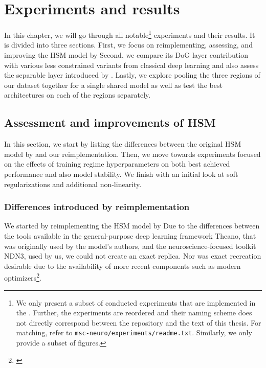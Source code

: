 \renewcommand*\thesubsubsection{\arabic{section}.\arabic{subsection}.\arabic{subsubsection}}
\setlength{\abovecaptionskip}{0pt plus 0pt minus 0pt} %

\chapter{Experiments and results}\label{ch:5}

In this chapter, we will go through all notable\footnote{We only present a subset of conducted experiments that are implemented in the . Further, the experiments are reordered and their naming scheme does not directly correspond between the repository and the text of this thesis. For matching, refer to \texttt{msc-neuro/experiments/readme.txt}. Similarly, we only provide a subset of figures.} experiments and their results. It is divided into three sections. First, we focus on reimplementing, assessing, and improving the HSM model by \cite{antolik} Second, we compare its DoG layer contribution with various less constrained variants from classical deep learning and also assess the separable layer introduced by \cite{klindt}. Lastly, we explore pooling the three regions of our dataset together for a single shared model as well as test the best architectures on each of the regions separately.


\section{Assessment and improvements of HSM}

In this section, we start by listing the differences between the original HSM model by \citeauthor{antolik} and our reimplementation. Then, we move towards experiments focused on the effects of training regime hyperparameters on both best achieved performance and also model stability. We finish with an initial look at soft regularizations and additional non-linearity.

\addtocounter{subsection}{-1} %
\subsection{Differences introduced by reimplementation}\label{ch:5.1.0}

We started by reimplementing the HSM model by \citeauthor{antolik} Due to the differences between the tools available in the general-purpose deep learning framework Theano, that was originally used by the model’s authors, and the neuroscience-focused toolkit NDN3, used by us, we could not create an exact replica. Nor was exact recreation desirable due to the availability of more recent components such as modern optimizers\footnote{\citep{2016arXiv160904747R}}.

